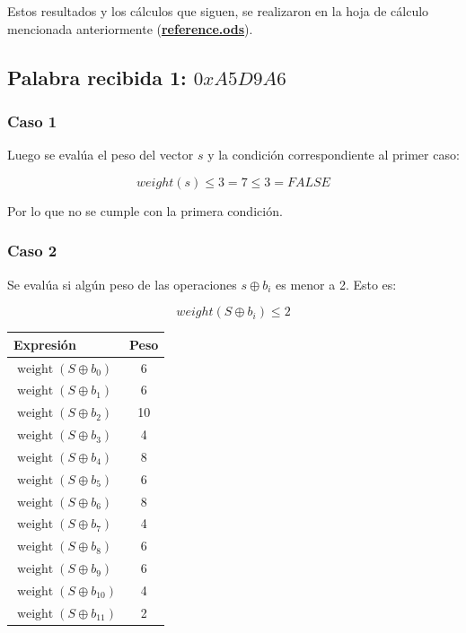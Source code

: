 Estos resultados y los cálculos que siguen, se realizaron en la hoja de cálculo mencionada anteriormente (\href{https://github.com/AbelCorvalan0/fec-lab2/tree/main/reference-calc}{\textbf{reference.ods}}).


\subsection{Palabra recibida 1: $0xA5D9A6$}

\subsubsection*{Caso 1}

Luego se evalúa el peso del vector $s$ y la condición correspondiente al primer caso:

$$ weight(s) \leq 3 = 7 \leq 3 = FALSE $$

Por lo que no se cumple con la primera condición.

\subsubsection*{Caso 2}

Se evalúa si algún peso de las operaciones $s \oplus b_{i}$ es menor a 2. Esto es:

$$ weight(S \oplus b_{i}) \leq 2 $$

\begin{table}[H]
    \centering
    \begin{tabular}{lc}
        \hline
        \textbf{Expresión} & \textbf{Peso} \\
        \hline
        $\operatorname{weight}(S \oplus b_0)$  & 6  \\
        $\operatorname{weight}(S \oplus b_1)$  & 6  \\
        $\operatorname{weight}(S \oplus b_2)$  & 10 \\
        $\operatorname{weight}(S \oplus b_3)$  & 4  \\
        $\operatorname{weight}(S \oplus b_4)$  & 8  \\
        $\operatorname{weight}(S \oplus b_5)$  & 6  \\
        $\operatorname{weight}(S \oplus b_6)$  & 8  \\
        $\operatorname{weight}(S \oplus b_7)$  & 4  \\
        $\operatorname{weight}(S \oplus b_8)$  & 6  \\
        $\operatorname{weight}(S \oplus b_9)$  & 6  \\
        $\operatorname{weight}(S \oplus b_{10})$ & 4 \\
        $\operatorname{weight}(S \oplus b_{11})$ & 2 \\
        \hline
    \end{tabular}
\end{table}

